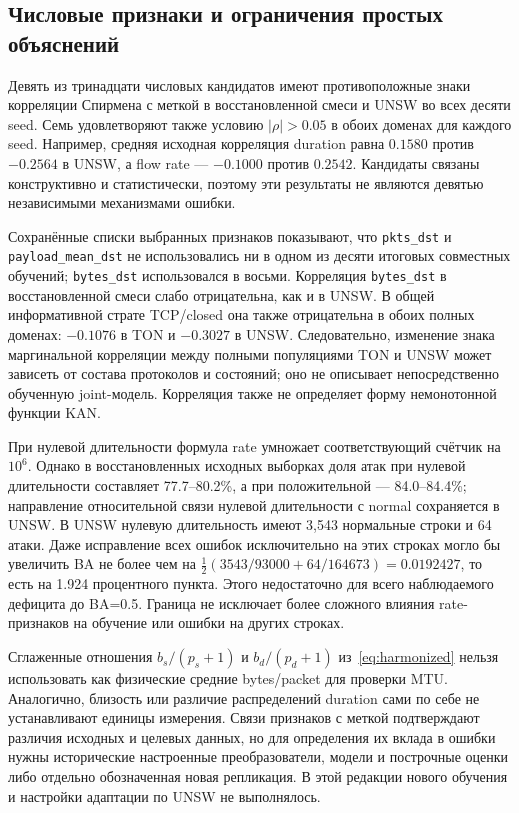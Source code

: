 \subsection{Числовые признаки и ограничения простых объяснений}
Девять из тринадцати числовых кандидатов имеют противоположные знаки корреляции Спирмена с меткой в восстановленной смеси и UNSW во всех десяти seed. Семь удовлетворяют также условию $|\rho|>0.05$ в обоих доменах для каждого seed. Например, средняя исходная корреляция duration равна $0.1580$ против $-0.2564$ в UNSW, а flow rate --- $-0.1000$ против $0.2542$. Кандидаты связаны конструктивно и статистически, поэтому эти результаты не являются девятью независимыми механизмами ошибки.

Сохранённые списки выбранных признаков показывают, что \texttt{pkts\_dst} и \texttt{payload\_mean\_dst} не использовались ни в одном из десяти итоговых совместных обучений; \texttt{bytes\_dst} использовался в восьми. Корреляция \texttt{bytes\_dst} в восстановленной смеси слабо отрицательна, как и в UNSW. В общей информативной страте TCP/closed она также отрицательна в обоих полных доменах: $-0.1076$ в TON и $-0.3027$ в UNSW. Следовательно, изменение знака маргинальной корреляции между полными популяциями TON и UNSW может зависеть от состава протоколов и состояний; оно не описывает непосредственно обученную joint-модель. Корреляция также не определяет форму немонотонной функции KAN.

При нулевой длительности формула rate умножает соответствующий счётчик на $10^6$. Однако в восстановленных исходных выборках доля атак при нулевой длительности составляет 77.7--80.2\%, а при положительной --- 84.0--84.4\%; направление относительной связи нулевой длительности с normal сохраняется в UNSW. В UNSW нулевую длительность имеют 3,543 нормальные строки и 64 атаки. Даже исправление всех ошибок исключительно на этих строках могло бы увеличить BA не более чем на $\tfrac12(3543/93000+64/164673)=0.0192427$, то есть на 1.924 процентного пункта. Этого недостаточно для всего наблюдаемого дефицита до BA=0.5. Граница не исключает более сложного влияния rate-признаков на обучение или ошибки на других строках.

Сглаженные отношения $b_s/(p_s+1)$ и $b_d/(p_d+1)$ из~\eqref{eq:harmonized} нельзя использовать как физические средние bytes/packet для проверки MTU. Аналогично, близость или различие распределений duration сами по себе не устанавливают единицы измерения. Связи признаков с меткой подтверждают различия исходных и целевых данных, но для определения их вклада в ошибки нужны исторические настроенные преобразователи, модели и построчные оценки либо отдельно обозначенная новая репликация. В этой редакции нового обучения и настройки адаптации по UNSW не выполнялось.
